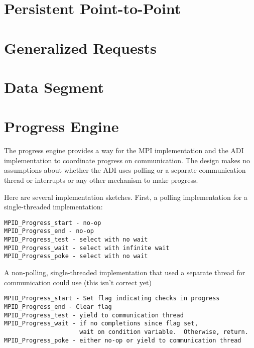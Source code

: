 \documentclass{article}
\begin{document}
\section{Persistent Point-to-Point}
\label{sec:persistent}






\section{Generalized Requests}
\label{sec:grequests}



\section{Data Segment}
\label{sec:segment-fcns}






\section{Progress Engine}
\label{sec:progress}
The progress engine provides a way for the MPI implementation and the
ADI implementation to coordinate progress on communication.  The
design makes no assumptions about whether the ADI uses polling or a
separate communication thread or interrupts or any other mechanism to
make progress.  

Here are several implementation sketches.
First, a polling implementation for a single-threaded implementation:
\begin{verbatim}
MPID_Progress_start - no-op
MPID_Progress_end - no-op
MPID_Progress_test - select with no wait
MPID_Progress_wait - select with infinite wait
MPID_Progress_poke - select with no wait
\end{verbatim}

A non-polling, single-threaded implementation that used a separate
thread for communication could use (this isn't correct yet)
\begin{verbatim}
MPID_Progress_start - Set flag indicating checks in progress
MPID_Progress_end - Clear flag
MPID_Progress_test - yield to communication thread
MPID_Progress_wait - if no completions since flag set, 
                     wait on condition variable.  Otherwise, return.
MPID_Progress_poke - either no-op or yield to communication thread
\end{verbatim}
\end{document}
